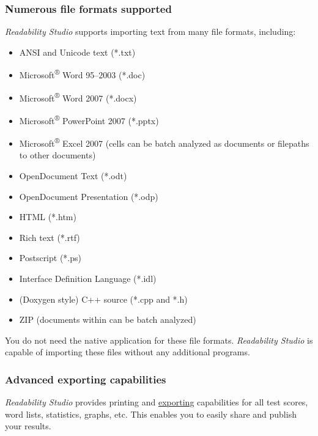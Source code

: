 \documentclass[
]{book}
\providecommand{\tightlist}{%
  \setlength{\itemsep}{0pt}\setlength{\parskip}{0pt}}
\theoremstyle{definition}
\theoremstyle{definition}
\theoremstyle{definition}
\theoremstyle{definition}
\theoremstyle{remark}
\begin{document}
\hypertarget{numerous-file-formats-supported}{%
\subsubsection*{Numerous file formats supported}\label{numerous-file-formats-supported}}

\emph{Readability Studio} supports importing text from many file formats, including:

\begin{itemize}
\tightlist
\item
  ANSI and Unicode text (*.txt)
\item
  Microsoft\textsuperscript{®} Word 95--2003 (*.doc)
\item
  Microsoft\textsuperscript{®} Word 2007 (*.docx)
\item
  Microsoft\textsuperscript{®} PowerPoint 2007 (*.pptx)
\item
  Microsoft\textsuperscript{®} Excel 2007 (cells can be batch analyzed as documents or filepaths to other documents)
\item
  OpenDocument Text (*.odt)
\item
  OpenDocument Presentation (*.odp)
\item
  HTML (*.htm)
\item
  Rich text (*.rtf)
\item
  Postscript (*.ps)
\item
  Interface Definition Language (*.idl)
\item
  (Doxygen style) C++ source (*.cpp and *.h)
\item
  ZIP (documents within can be batch analyzed)
\end{itemize}

You do not need the native application for these file formats. \emph{Readability Studio} is capable of importing these files without any additional programs.

\hypertarget{advanced-exporting-capabilities}{%
\subsubsection*{Advanced exporting capabilities}\label{advanced-exporting-capabilities}}

\emph{Readability Studio} provides printing and \protect\hyperlink{exporting}{exporting} capabilities for all test scores, word lists, statistics, graphs, etc. This enables you to easily share and publish your results.
\end{document}
